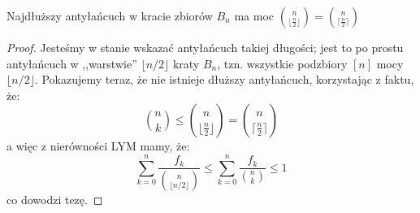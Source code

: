 \begin{theorem}
	Najdłuższy antyłańcuch w kracie zbiorów $B_n$ ma moc $\binom{n}{\lfloor\frac{n}{2}\rfloor} = \binom{n}{\lceil\frac{n}{2}\rceil}$
\end{theorem}

\begin{proof}
	Jesteśmy w stanie wskazać antyłańcuch takiej długości; jest to po prostu antyłańcuch w ,,warstwie'' $\lfloor n/2 \rfloor$ kraty $B_n$, tzn. wszystkie podzbiory $[n]$ mocy $\lfloor n/2 \rfloor$. Pokazujemy teraz, że nie istnieje dłuższy antyłańcuch, korzystając z faktu, że:
	\begin{equation*}
		\binom{n}{k} \leq \binom{n}{\lfloor\frac{n}{2}\rfloor} = \binom{n}{\lceil\frac{n}{2}\rceil}
	\end{equation*}
	a więc z nierówności LYM mamy, że:
	\begin{equation*}
		\sum_{k=0}^{n}\frac{f_k}{\binom{n}{\lfloor n/2 \rfloor}} \leq \sum_{k=0}^{n}\frac{f_k}{\binom{n}{k}} \leq 1
	\end{equation*}
	co dowodzi tezę.
\end{proof}